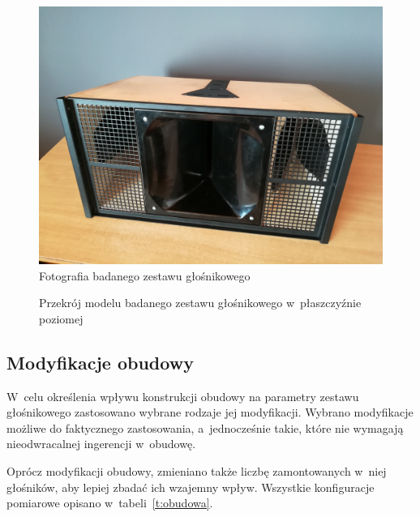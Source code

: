 \documentclass[12pt]{oska}
\begin{document}
		
		\begin{figure}[!ht]
		\centering
		\includegraphics[width=.8\textwidth]{zdjecie.jpg}
		\caption{Fotografia badanego zestawu głośnikowego}
		\label{r:zdjecie}
		\end{figure}
		
		\begin{figure}[!ht]
			\centering
			\caption{Przekrój modelu badanego zestawu głośnikowego w~płaszczyźnie poziomej}
			\label{r:przekroj}
		\end{figure}
	
	\subsection{Modyfikacje obudowy}
	
		W~celu określenia wpływu konstrukcji obudowy na parametry zestawu głośnikowego zastosowano wybrane rodzaje jej modyfikacji. Wybrano modyfikacje możliwe do faktycznego zastosowania, a~jednocześnie takie, które nie wymagają nieodwracalnej ingerencji w~obudowę.
		
		Oprócz modyfikacji obudowy, zmieniano także liczbę zamontowanych w~niej głośników, aby lepiej zbadać ich wzajemny wpływ. Wszystkie konfiguracje pomiarowe opisano w~tabeli~\ref{t:obudowa}.
		
\end{document}
